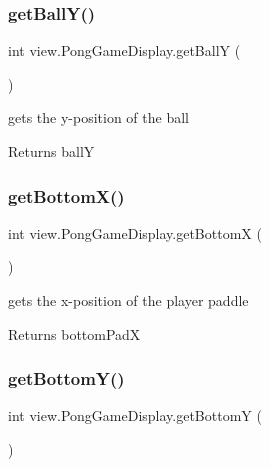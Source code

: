 \subsubsection{\texorpdfstring{get\+Ball\+Y()}{getBallY()}}
{\footnotesize\ttfamily int view.\+Pong\+Game\+Display.\+get\+BallY (\begin{DoxyParamCaption}{ }\end{DoxyParamCaption})}



gets the y-\/position of the ball 

\begin{DoxyReturn}{Returns}
ballY 
\end{DoxyReturn}
\hypertarget{classview_1_1_pong_game_display_ab5d2d9429f7d666fea097c2ea3118893}{}\label{classview_1_1_pong_game_display_ab5d2d9429f7d666fea097c2ea3118893} 
\subsubsection{\texorpdfstring{get\+Bottom\+X()}{getBottomX()}}
{\footnotesize\ttfamily int view.\+Pong\+Game\+Display.\+get\+BottomX (\begin{DoxyParamCaption}{ }\end{DoxyParamCaption})}



gets the x-\/position of the player paddle 

\begin{DoxyReturn}{Returns}
bottom\+PadX 
\end{DoxyReturn}
\hypertarget{classview_1_1_pong_game_display_afa4d22c9959dc02057a1b56fef3f33cd}{}\label{classview_1_1_pong_game_display_afa4d22c9959dc02057a1b56fef3f33cd} 
\subsubsection{\texorpdfstring{get\+Bottom\+Y()}{getBottomY()}}
{\footnotesize\ttfamily int view.\+Pong\+Game\+Display.\+get\+BottomY (\begin{DoxyParamCaption}{ }\end{DoxyParamCaption})}




